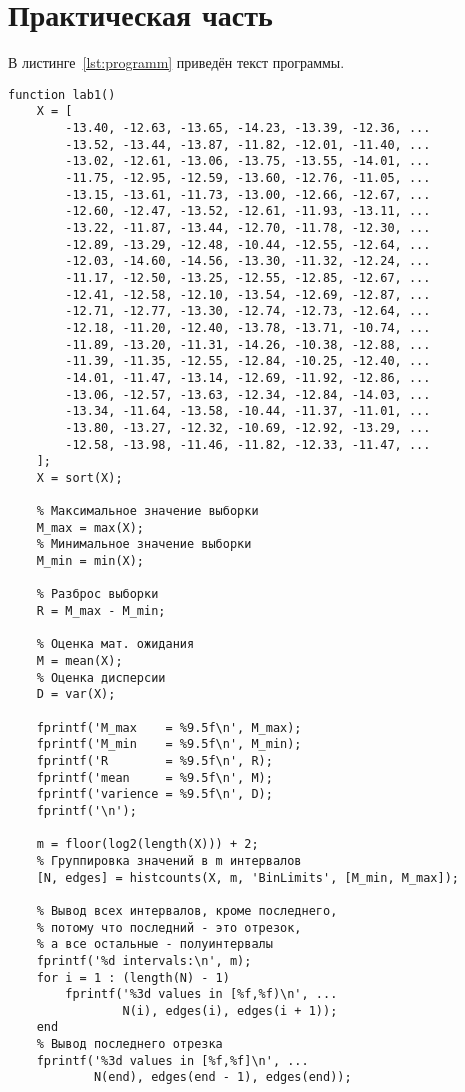 \chapter{Практическая часть}

\lstset{language=matlab}

В листинге~\ref{lst:programm} приведён текст программы.
\begin{lstlisting}[caption={Текст программы},label={lst:programm}]
function lab1()
    X = [
        -13.40, -12.63, -13.65, -14.23, -13.39, -12.36, ...
        -13.52, -13.44, -13.87, -11.82, -12.01, -11.40, ...
        -13.02, -12.61, -13.06, -13.75, -13.55, -14.01, ...
        -11.75, -12.95, -12.59, -13.60, -12.76, -11.05, ...
        -13.15, -13.61, -11.73, -13.00, -12.66, -12.67, ...
        -12.60, -12.47, -13.52, -12.61, -11.93, -13.11, ...
        -13.22, -11.87, -13.44, -12.70, -11.78, -12.30, ...
        -12.89, -13.29, -12.48, -10.44, -12.55, -12.64, ...
        -12.03, -14.60, -14.56, -13.30, -11.32, -12.24, ...
        -11.17, -12.50, -13.25, -12.55, -12.85, -12.67, ...
        -12.41, -12.58, -12.10, -13.54, -12.69, -12.87, ...
        -12.71, -12.77, -13.30, -12.74, -12.73, -12.64, ...
        -12.18, -11.20, -12.40, -13.78, -13.71, -10.74, ...
        -11.89, -13.20, -11.31, -14.26, -10.38, -12.88, ...
        -11.39, -11.35, -12.55, -12.84, -10.25, -12.40, ...
        -14.01, -11.47, -13.14, -12.69, -11.92, -12.86, ...
        -13.06, -12.57, -13.63, -12.34, -12.84, -14.03, ...
        -13.34, -11.64, -13.58, -10.44, -11.37, -11.01, ...
        -13.80, -13.27, -12.32, -10.69, -12.92, -13.29, ...
        -12.58, -13.98, -11.46, -11.82, -12.33, -11.47, ...
    ];
    X = sort(X);

    % Максимальное значение выборки
    M_max = max(X);
    % Минимальное значение выборки
    M_min = min(X);

    % Разброс выборки
    R = M_max - M_min;

    % Оценка мат. ожидания
    M = mean(X);
    % Оценка дисперсии
    D = var(X);

    fprintf('M_max    = %9.5f\n', M_max);
    fprintf('M_min    = %9.5f\n', M_min);
    fprintf('R        = %9.5f\n', R);
    fprintf('mean     = %9.5f\n', M);
    fprintf('varience = %9.5f\n', D);
    fprintf('\n');

    m = floor(log2(length(X))) + 2;
    % Группировка значений в m интервалов
    [N, edges] = histcounts(X, m, 'BinLimits', [M_min, M_max]);

    % Вывод всех интервалов, кроме последнего,
    % потому что последний - это отрезок,
    % а все остальные - полуинтервалы
    fprintf('%d intervals:\n', m);
    for i = 1 : (length(N) - 1)
        fprintf('%3d values in [%f,%f)\n', ...
                N(i), edges(i), edges(i + 1));
    end
    % Вывод последнего отрезка
    fprintf('%3d values in [%f,%f]\n', ...
            N(end), edges(end - 1), edges(end));


\end{lstlisting}
